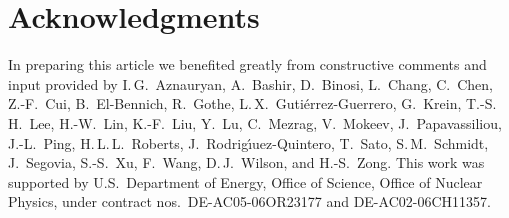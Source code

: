 \documentclass[rmp, aps, floatfix, nofootinbib, twocolumn]{revtex4-1}
\begin{document}
\date{21 September 2017}

\maketitle


\tableofcontents













%

\section*{Acknowledgments}
In preparing this article we benefited greatly from constructive comments and input provided by
%
I.\,G.~Aznauryan,
%
A.~Bashir,
%
D.~Binosi,
%
L.~Chang,
%
C.~Chen,
%
Z.-F.~Cui,
%
B.~El-Bennich,
%
R.~Gothe,
%
L.\,X.~Guti\'errez-Guerrero,
%
G.~Krein,
%
T.-S.\,H.~Lee,
%
H.-W.~Lin,
%
K.-F.~Liu,
%
Y.~Lu,
%
C.~Mezrag,
%
V.~Mokeev,
%
J.~Papavassiliou,
%
J.-L.~Ping,
%
H.\,L.\,L.~Roberts,
%
J.~Rodrig\'{\i}uez-Quintero,
%
T.~Sato,
%
S.\,M.~Schmidt,
%
J.~Segovia,
%
S.-S.~Xu,
%
F.~Wang,
%
D.\,J.~Wilson,
%
and H.-S.~Zong.
%
This work was supported by
%
U.S.\ Department of Energy, Office of Science, Office of Nuclear Physics, under contract nos.~DE-AC05-06OR23177 and DE-AC02-06CH11357.


%


%
%
\end{document}
